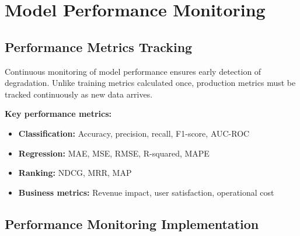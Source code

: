 \section{Model Performance Monitoring}

\subsection{Performance Metrics Tracking}

Continuous monitoring of model performance ensures early detection of degradation. Unlike training metrics calculated once, production metrics must be tracked continuously as new data arrives.

\textbf{Key performance metrics:}
\begin{itemize}
    \item \textbf{Classification:} Accuracy, precision, recall, F1-score, AUC-ROC
    \item \textbf{Regression:} MAE, MSE, RMSE, R-squared, MAPE
    \item \textbf{Ranking:} NDCG, MRR, MAP
    \item \textbf{Business metrics:} Revenue impact, user satisfaction, operational cost
\end{itemize}

\subsection{Performance Monitoring Implementation}


